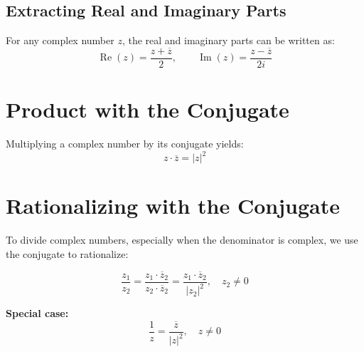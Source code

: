\documentclass{article}
\begin{document}
\subsection*{Extracting Real and Imaginary Parts}

For any complex number \( z \), the real and imaginary parts can be written as:
\begin{equation}
\operatorname{Re}(z) = \frac{z + \overline{z}}{2}, \qquad 
\operatorname{Im}(z) = \frac{z - \overline{z}}{2i}
\label{eq:re_im}
\end{equation}

\section*{Product with the Conjugate}

Multiplying a complex number by its conjugate yields:
\begin{equation}
z \cdot \overline{z} = |z|^2
\label{eq:product_conjugate}
\end{equation}

\section*{Rationalizing with the Conjugate}

To divide complex numbers, especially when the denominator is complex, we use the conjugate to rationalize:

\begin{equation}
\frac{z_1}{z_2} = \frac{z_1 \cdot \overline{z}_2}{z_2 \cdot \overline{z}_2} = \frac{z_1 \cdot \overline{z}_2}{|z_2|^2}, \quad z_2 \ne 0
\label{eq:division}
\end{equation}

\textbf{Special case:}
\begin{equation}
\frac{1}{z} = \frac{\overline{z}}{|z|^2}, \quad z \ne 0
\label{eq:reciprocal}
\end{equation}
\end{document}
